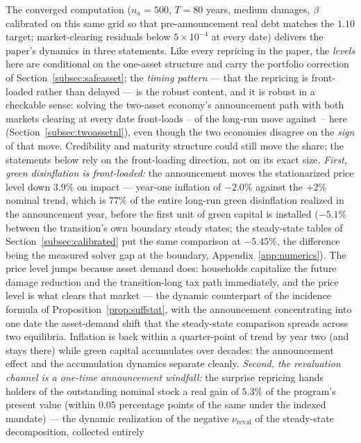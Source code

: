 \documentclass[12pt]{article}
\providecommand{\pendingnum}{\textit{--}}
\providecommand{\TwoTrShare}{\pendingnum}\providecommand{\TwoTrImpQ}{\pendingnum}
\begin{document}
The converged computation ($n_a = 500$, $T = 80$ years, medium damages,
$\beta$ calibrated on this same grid so that pre-announcement real debt
matches the $1.10$ target; market-clearing residuals below $5\times10^{-4}$
at every date) delivers the paper's dynamics in three statements. Like every repricing in the paper, the
\emph{levels} here are conditional on the one-asset structure and carry the
portfolio correction of Section~\ref{subsec:safeasset}; the
\emph{timing pattern} --- that the repricing is
front-loaded rather than delayed --- is the robust content, and it is robust
in a checkable sense: solving the two-asset economy's announcement path with
both markets clearing at every date front-loads $\TwoTrShare$ of the
long-run move against $\OneTrShare$ here
(Section~\ref{subsec:twoassetnl}), even though the two economies disagree
on the \emph{sign} of that move. Credibility and maturity structure could
still move the share; the statements below rely on the front-loading
direction, not on its exact size. \emph{First, green disinflation is
front-loaded:} the announcement moves the stationarized price level down
$3.9\%$ on impact --- year-one inflation of $-2.0\%$ against the $+2\%$
nominal trend, which is $77\%$ of the entire long-run green
disinflation realized in the announcement
year, before the first unit of green capital is installed ($-5.1\%$ between
the transition's own boundary steady states; the steady-state tables of
Section~\ref{subsec:calibrated} put the same comparison at $-5.45\%$, the
difference being the measured solver gap at the boundary,
Appendix~\ref{app:numerics}). The price
level jumps because asset demand does: households capitalize the future
damage reduction and the transition-long tax path immediately, and the
price level is what clears that market --- the dynamic counterpart of the
incidence formula of Proposition~\ref{prop:suffstat}, with the announcement
concentrating into one date the asset-demand shift that the steady-state
comparison spreads across two equilibria. Inflation is back within a
quarter-point of trend by year two (and stays there) while green
capital accumulates over decades: the announcement effect and the
accumulation dynamics separate cleanly.
\emph{Second, the revaluation channel is a one-time announcement windfall:}
the surprise repricing hands holders of the outstanding nominal stock a
real gain of $5.3\%$ of the program's present value (within $0.05$
percentage points of the same under the indexed mandate) --- the dynamic
realization of the negative
$\nu_{\text{reval}}$ of the steady-state decomposition, collected entirely
\end{document}
